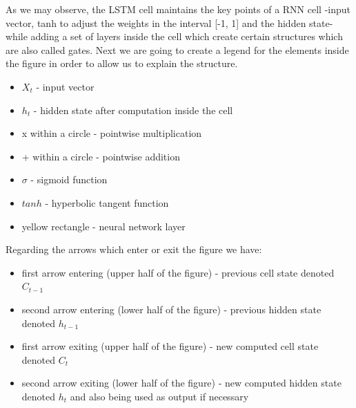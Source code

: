 As we may observe, the LSTM cell maintains the key points of a RNN cell -input vector, tanh to adjust the weights in the interval [-1, 1] and the hidden state- while adding a set of layers inside the cell which create certain structures which are also called gates. Next we are going to create a legend for the elements inside the figure in order to allow us to explain the structure.

\begin{itemize}
    \item $\displaystyle X_t$ - input vector
    \item $\displaystyle h_t$ - hidden state after computation inside the cell
    \item x within a circle - pointwise multiplication
    \item + within a circle - pointwise addition
    \item $\displaystyle \sigma$ - sigmoid function
    \item $\displaystyle tanh$ - hyperbolic tangent function
    \item yellow rectangle - neural network layer
\end{itemize}

Regarding the arrows which enter or exit the figure we have:

\begin{itemize}
    \item first arrow entering (upper half of the figure) - previous cell state denoted $\displaystyle C_{t-1}$
    \item second arrow entering (lower half of the figure) - previous hidden state denoted $\displaystyle h_{t-1}$
    \item first arrow exiting (upper half of the figure) - new computed cell state denoted $\displaystyle C_t$
    \item second arrow exiting (lower half of the figure) - new computed hidden state denoted $\displaystyle h_t$ and also being used as output if necessary
\end{itemize}

